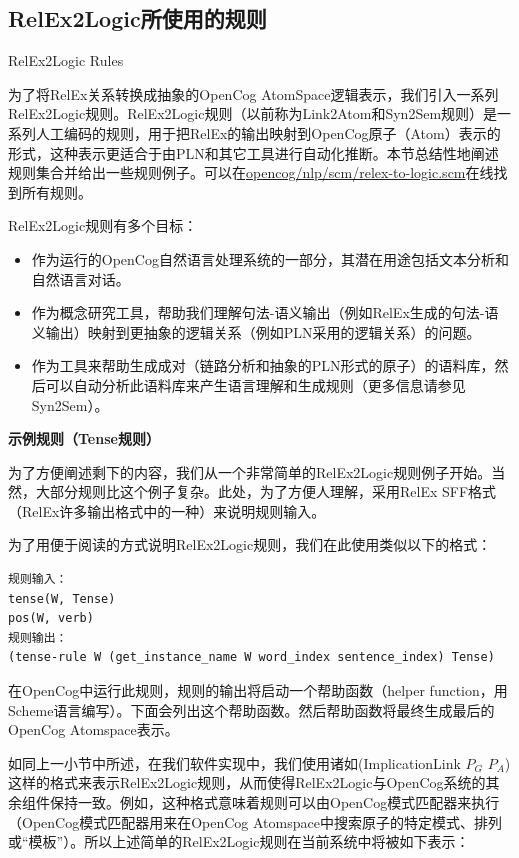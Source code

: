 \subsection{RelEx2Logic所使用的规则}{RelEx2Logic Rules}

为了将RelEx关系转换成抽象的OpenCog AtomSpace逻辑表示，我们引入一系列RelEx2Logic规则。RelEx2Logic规则（以前称为Link2Atom和Syn2Sem规则\cite{Lian2012}）是一系列人工编码的规则，用于把RelEx的输出映射到OpenCog原子（Atom）表示的形式，这种表示更适合于由PLN和其它工具进行自动化推断。本节总结性地阐述规则集合并给出一些规则例子。可以在\url{opencog/nlp/scm/relex-to-logic.scm}在线找到所有规则。

RelEx2Logic规则有多个目标：

\begin{itemize}
\item 作为运行的OpenCog自然语言处理系统的一部分，其潜在用途包括文本分析和自然语言对话。
\item 作为概念研究工具，帮助我们理解句法-语义输出（例如RelEx生成的句法-语义输出）映射到更抽象的逻辑关系（例如PLN采用的逻辑关系）的问题。
\item 作为工具来帮助生成成对（链路分析和抽象的PLN形式的原子）的语料库，然后可以自动分析此语料库来产生语言理解和生成规则（更多信息请参见Syn2Sem）。
\end{itemize}

{\bf 示例规则（Tense规则）}

为了方便阐述剩下的内容，我们从一个非常简单的RelEx2Logic规则例子开始。当然，大部分规则比这个例子复杂。此处，为了方便人理解，采用RelEx SFF格式（RelEx许多输出格式中的一种）来说明规则输入。

为了用便于阅读的方式说明RelEx2Logic规则，我们在此使用类似以下的格式：

\begin{verbatim}
规则输入：
tense(W, Tense)
pos(W, verb)
规则输出：
(tense-rule W (get_instance_name W word_index sentence_index) Tense)
\end{verbatim}

在OpenCog中运行此规则，规则的输出将启动一个帮助函数（helper function，用Scheme语言编写）。下面会列出这个帮助函数。然后帮助函数将最终生成最后的OpenCog Atomspace表示。

如同上一小节中所述，在我们软件实现中，我们使用诸如(ImplicationLink $P_G$ $P_A$)这样的格式来表示RelEx2Logic规则，从而使得RelEx2Logic与OpenCog系统的其余组件保持一致。例如，这种格式意味着规则可以由OpenCog模式匹配器来执行（OpenCog模式匹配器用来在OpenCog Atomspace中搜索原子的特定模式、排列或“模板”）。所以上述简单的RelEx2Logic规则在当前系统中将被如下表示：


